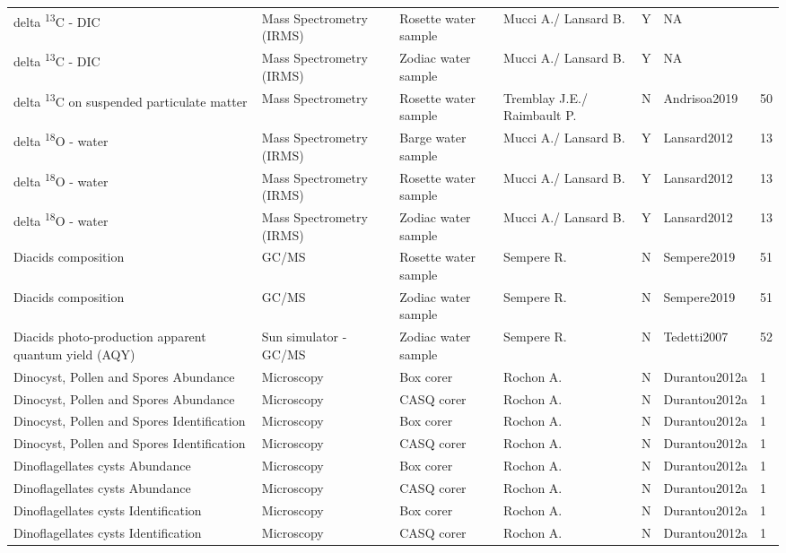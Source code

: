 \begin{ThreePartTable}
\begin{longtable}[t]{lllllll}
delta \textsuperscript{13}C - DIC & Mass Spectrometry (IRMS) & Rosette water sample & Mucci A./ Lansard B. & Y & NA & \\
delta \textsuperscript{13}C - DIC & Mass Spectrometry (IRMS) & Zodiac water sample & Mucci A./ Lansard B. & Y & NA & \\
\addlinespace
delta \textsuperscript{13}C on suspended particulate matter & Mass Spectrometry & Rosette water sample & Tremblay J.E./ Raimbault P. & N & Andrisoa2019 & 50\\
delta \textsuperscript{18}O - water & Mass Spectrometry (IRMS) & Barge water sample & Mucci A./ Lansard B. & Y & Lansard2012 & 13\\
delta \textsuperscript{18}O - water & Mass Spectrometry (IRMS) & Rosette water sample & Mucci A./ Lansard B. & Y & Lansard2012 & 13\\
delta \textsuperscript{18}O - water & Mass Spectrometry (IRMS) & Zodiac water sample & Mucci A./ Lansard B. & Y & Lansard2012 & 13\\
Diacids composition & GC/MS & Rosette water sample & Sempere R. & N & Sempere2019 & 51\\
\addlinespace
Diacids composition & GC/MS & Zodiac water sample & Sempere R. & N & Sempere2019 & 51\\
Diacids photo-production apparent quantum yield (AQY) & Sun simulator - GC/MS & Zodiac water sample & Sempere R. & N & Tedetti2007 & 52\\
Dinocyst, Pollen and Spores Abundance & Microscopy & Box corer & Rochon A. & N & Durantou2012a & 1\\
Dinocyst, Pollen and Spores Abundance & Microscopy & CASQ corer & Rochon A. & N & Durantou2012a & 1\\
Dinocyst, Pollen and Spores Identification & Microscopy & Box corer & Rochon A. & N & Durantou2012a & 1\\
\addlinespace
Dinocyst, Pollen and Spores Identification & Microscopy & CASQ corer & Rochon A. & N & Durantou2012a & 1\\
Dinoflagellates cysts Abundance & Microscopy & Box corer & Rochon A. & N & Durantou2012a & 1\\
Dinoflagellates cysts Abundance & Microscopy & CASQ corer & Rochon A. & N & Durantou2012a & 1\\
Dinoflagellates cysts Identification & Microscopy & Box corer & Rochon A. & N & Durantou2012a & 1\\
Dinoflagellates cysts Identification & Microscopy & CASQ corer & Rochon A. & N & Durantou2012a & 1\\

\end{longtable}
\end{ThreePartTable}
